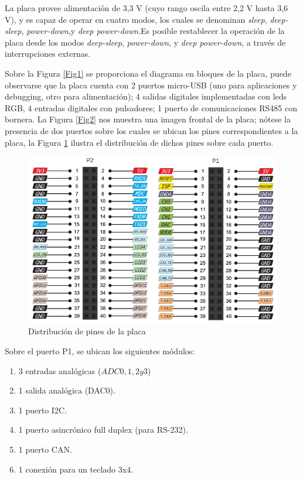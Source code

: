 \documentclass[12pt,letterpaper]{article}
\begin{document}
La placa provee alimentación de 3,3 V (cuyo rango oscila entre 2,2 V hasta 3,6 V), y es capaz de operar en cuatro modos, los cuales se denominan \textit{sleep}, \textit{deep-sleep}, \textit{power-down},y \textit{deep power-down}.Es posible restablecer la operación de la placa desde los modos \textit{deep-sleep}, \textit{power-down}, y \textit{deep power-down}, a través de interrupciones externas.


Sobre la Figura  \ref{Fig1} se proporciona el diagrama en bloques de la placa\cite{diagramaenbloquesdeplaca}, puede observarse que la placa cuenta con 2 puertos micro-USB (uno para aplicaciones y debugging, otro para alimentación); 4 salidas digitales implementadas con leds RGB, 4 entradas digitales con pulsadores; 1 puerto de comunicaciones RS485 con bornera. La Figura  \ref{Fig2} nos muestra  una imagen frontal de la placa; nótese la presencia de dos puertos sobre los cuales se ubican los pines correspondientes a la placa, la Figura  \ref{distribucionpines} ilustra el distribución de dichos pines sobre cada puerto.

\begin{center}
\begin{figure}[!h]
\centering
\includegraphics[width=8 cm]{figuras/f16.png}
\caption{Distribución de pines de la placa}
\label{distribucionpines}
\end{figure}
\end{center}

Sobre el puerto P1, se ubican los siguientes módulos:

\begin{enumerate}
\item 3 entradas analógicas ($ADC0,1,2 y 3$)
\item 1 salida analógica (DAC0).
\item 1 puerto I2C.
\item 1 puerto asincrónico full duplex (para RS-232).
\item 1 puerto CAN.
\item 1 conexión para un teclado 3x4.
\end{enumerate}
\end{document}
